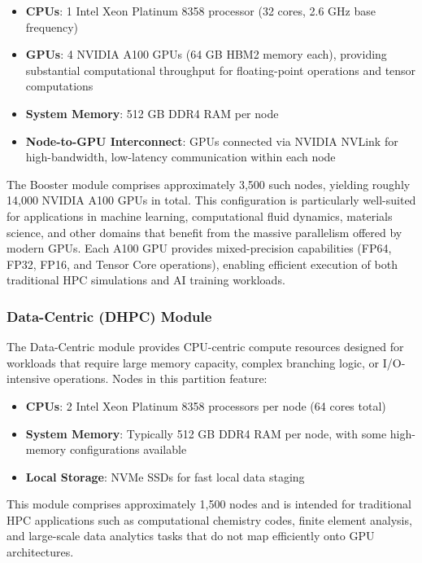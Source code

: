\begin{itemize}
    \item \textbf{CPUs}: 1 Intel Xeon Platinum 8358 processor (32 cores, 2.6 GHz base frequency)
    \item \textbf{GPUs}: 4 NVIDIA A100 GPUs (64 GB HBM2 memory each), providing substantial computational throughput for floating-point operations and tensor computations
    \item \textbf{System Memory}: 512 GB DDR4 RAM per node
    \item \textbf{Node-to-GPU Interconnect}: GPUs connected via NVIDIA NVLink for high-bandwidth, low-latency communication within each node
\end{itemize}

The Booster module comprises approximately 3,500 such nodes, yielding roughly 14,000 NVIDIA A100 GPUs in total. This configuration is particularly well-suited for applications in machine learning, computational fluid dynamics, materials science, and other domains that benefit from the massive parallelism offered by modern GPUs. Each A100 GPU provides mixed-precision capabilities (FP64, FP32, FP16, and Tensor Core operations), enabling efficient execution of both traditional HPC simulations and AI training workloads.

\subsubsection{Data-Centric (DHPC) Module}

The Data-Centric module provides CPU-centric compute resources designed for workloads that require large memory capacity, complex branching logic, or I/O-intensive operations. Nodes in this partition feature:

\begin{itemize}
    \item \textbf{CPUs}: 2 Intel Xeon Platinum 8358 processors per node (64 cores total)
    \item \textbf{System Memory}: Typically 512 GB DDR4 RAM per node, with some high-memory configurations available
    \item \textbf{Local Storage}: NVMe SSDs for fast local data staging
\end{itemize}

This module comprises approximately 1,500 nodes and is intended for traditional HPC applications such as computational chemistry codes, finite element analysis, and large-scale data analytics tasks that do not map efficiently onto GPU architectures.

